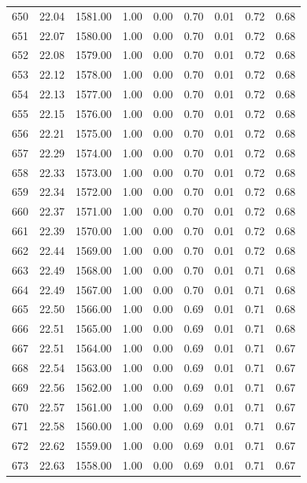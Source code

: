 \documentclass{article}\usepackage[]{graphicx}\usepackage[]{color}
\begin{document}
\begin{longtable}{rrrrrrrrr}
  650 & 22.04 & 1581.00 & 1.00 & 0.00 & 0.70 & 0.01 & 0.72 & 0.68 \\ 
  651 & 22.07 & 1580.00 & 1.00 & 0.00 & 0.70 & 0.01 & 0.72 & 0.68 \\ 
  652 & 22.08 & 1579.00 & 1.00 & 0.00 & 0.70 & 0.01 & 0.72 & 0.68 \\ 
  653 & 22.12 & 1578.00 & 1.00 & 0.00 & 0.70 & 0.01 & 0.72 & 0.68 \\ 
  654 & 22.13 & 1577.00 & 1.00 & 0.00 & 0.70 & 0.01 & 0.72 & 0.68 \\ 
  655 & 22.15 & 1576.00 & 1.00 & 0.00 & 0.70 & 0.01 & 0.72 & 0.68 \\ 
  656 & 22.21 & 1575.00 & 1.00 & 0.00 & 0.70 & 0.01 & 0.72 & 0.68 \\ 
  657 & 22.29 & 1574.00 & 1.00 & 0.00 & 0.70 & 0.01 & 0.72 & 0.68 \\ 
  658 & 22.33 & 1573.00 & 1.00 & 0.00 & 0.70 & 0.01 & 0.72 & 0.68 \\ 
  659 & 22.34 & 1572.00 & 1.00 & 0.00 & 0.70 & 0.01 & 0.72 & 0.68 \\ 
  660 & 22.37 & 1571.00 & 1.00 & 0.00 & 0.70 & 0.01 & 0.72 & 0.68 \\ 
  661 & 22.39 & 1570.00 & 1.00 & 0.00 & 0.70 & 0.01 & 0.72 & 0.68 \\ 
  662 & 22.44 & 1569.00 & 1.00 & 0.00 & 0.70 & 0.01 & 0.72 & 0.68 \\ 
  663 & 22.49 & 1568.00 & 1.00 & 0.00 & 0.70 & 0.01 & 0.71 & 0.68 \\ 
  664 & 22.49 & 1567.00 & 1.00 & 0.00 & 0.70 & 0.01 & 0.71 & 0.68 \\ 
  665 & 22.50 & 1566.00 & 1.00 & 0.00 & 0.69 & 0.01 & 0.71 & 0.68 \\ 
  666 & 22.51 & 1565.00 & 1.00 & 0.00 & 0.69 & 0.01 & 0.71 & 0.68 \\ 
  667 & 22.51 & 1564.00 & 1.00 & 0.00 & 0.69 & 0.01 & 0.71 & 0.67 \\ 
  668 & 22.54 & 1563.00 & 1.00 & 0.00 & 0.69 & 0.01 & 0.71 & 0.67 \\ 
  669 & 22.56 & 1562.00 & 1.00 & 0.00 & 0.69 & 0.01 & 0.71 & 0.67 \\ 
  670 & 22.57 & 1561.00 & 1.00 & 0.00 & 0.69 & 0.01 & 0.71 & 0.67 \\ 
  671 & 22.58 & 1560.00 & 1.00 & 0.00 & 0.69 & 0.01 & 0.71 & 0.67 \\ 
  672 & 22.62 & 1559.00 & 1.00 & 0.00 & 0.69 & 0.01 & 0.71 & 0.67 \\ 
  673 & 22.63 & 1558.00 & 1.00 & 0.00 & 0.69 & 0.01 & 0.71 & 0.67 \\ 

\end{longtable}
\end{document}

